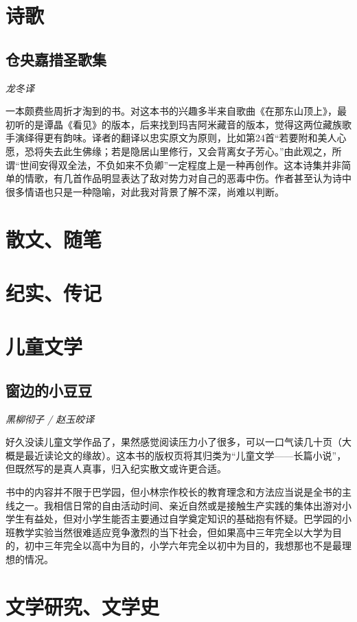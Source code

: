\par {}

\section{诗歌}

\subsection*{仓央嘉措圣歌集}
\par \emph{龙冬译} 
\par 一本颇费些周折才淘到的书。对这本书的兴趣多半来自歌曲《在那东山顶上》，最初听的是谭晶《看见》的版本，后来找到玛吉阿米藏音的版本，觉得这两位藏族歌手演绎得更有韵味。译者的翻译以忠实原文为原则，比如第24首“若要附和美人心愿，恐将失去此生佛缘；若是隐居山里修行，又会背离女子芳心。”由此观之，所谓“世间安得双全法，不负如来不负卿”一定程度上是一种再创作。这本诗集并非简单的情歌，有几首作品明显表达了敌对势力对自己的恶毒中伤。作者甚至认为诗中很多情语也只是一种隐喻，对此我对背景了解不深，尚难以判断。
\par {}

\section{散文、随笔}

\section{纪实、传记}

\section{儿童文学}

\subsection*{窗边的小豆豆}
\par \emph{黑柳彻子 / 赵玉皎译} 
\par 好久没读儿童文学作品了，果然感觉阅读压力小了很多，可以一口气读几十页（大概是最近读论文的缘故）。这本书的版权页将其归类为“儿童文学——长篇小说”，但既然写的是真人真事，归入纪实散文或许更合适。
\par 书中的内容并不限于巴学园，但小林宗作校长的教育理念和方法应当说是全书的主线之一。我相信日常的自由活动时间、亲近自然或是接触生产实践的集体出游对小学生有益处，但对小学生能否主要通过自学奠定知识的基础抱有怀疑。巴学园的小班教学实验当然很难适应竞争激烈的当下社会，但如果高中三年完全以大学为目的，初中三年完全以高中为目的，小学六年完全以初中为目的，我想那也不是最理想的情况。
\par {}

\section{文学研究、文学史}

